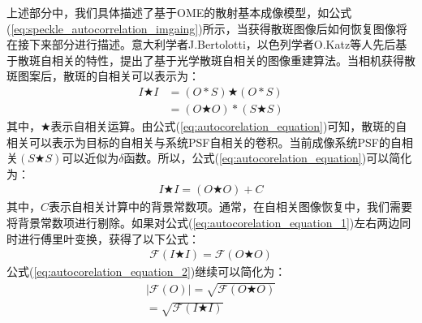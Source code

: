 上述部分中，我们具体描述了基于OME的散射基本成像模型，如公式(\ref{eq:speckle_autocorrelation_imgaing})所示，当获得散斑图像后如何恢复图像将在接下来部分进行描述。意大利学者J.Bertolotti，以色列学者O.Katz等人先后基于散斑自相关的特性，提出了基于光学散斑自相关的图像重建算法。当相机获得散斑图案后，散斑的自相关可以表示为：
\begin{equation}
\begin{aligned}
    I \bigstar I  &= (O*S) \bigstar (O*S) \\
		              &=  (O \bigstar O)*(S \bigstar S)
\end{aligned}
\label{eq:autocorelation_equation}
\end{equation}
其中，$\bigstar$表示自相关运算。由公式(\ref{eq:autocorelation_equation})可知，散斑的自相关可以表示为目标的自相关与系统PSF自相关的卷积。当前成像系统PSF的自相关$(S \bigstar S)$可以近似为$\delta$函数。所以，公式(\ref{eq:autocorelation_equation})可以简化为：
\begin{equation}
\begin{aligned}
    I \bigstar I  = (O \bigstar O)+C
\end{aligned}
\label{eq:autocorelation_equation_1}
\end{equation}
其中，$C$表示自相关计算中的背景常数项。通常，在自相关图像恢复中，我们需要将背景常数项进行剔除。如果对公式(\ref{eq:autocorelation_equation_1})左右两边同时进行傅里叶变换，获得了以下公式：
\begin{equation}
\begin{aligned}
    \mathcal{F}(I \bigstar I)  = \mathcal{F}(O \bigstar O)
\end{aligned}
\label{eq:autocorelation_equation_2}
\end{equation}
公式(\ref{eq:autocorelation_equation_2})继续可以简化为：
\begin{equation}
\begin{aligned}
    \mid \mathcal{F}(O) \mid = \sqrt{\mathcal{F}(O \bigstar O)}\\
		               = \sqrt{\mathcal{F}(I \bigstar I)}
\end{aligned}
\label{eq:autocorelation_equation_3}
\end{equation}
